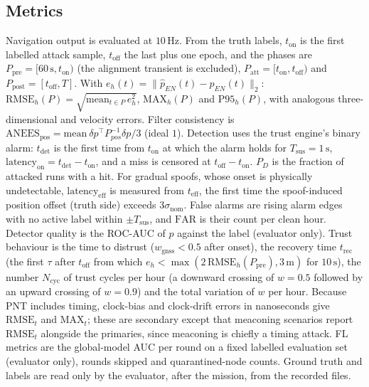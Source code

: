 \documentclass[journal]{IEEEtran}
\begin{document}
\subsection{Metrics}
\label{sec:metrics}
Navigation output is evaluated at $10\,\mathrm{Hz}$. From the truth labels, $t_{\mathrm{on}}$ is the first
labelled attack sample, $t_{\mathrm{off}}$ the last plus one epoch, and the phases are
$P_{\mathrm{pre}} = [60\,\mathrm{s}, t_{\mathrm{on}})$ (the alignment transient is excluded),
$P_{\mathrm{att}} = [t_{\mathrm{on}}, t_{\mathrm{off}})$ and $P_{\mathrm{post}} = [t_{\mathrm{off}}, T]$.
With $e_h(t) = \lVert \hat p_{EN}(t) - p_{EN}(t)\rVert_2$:
$\mathrm{RMSE}_h(P) = \sqrt{\mathrm{mean}_{t\in P}\,e_h^2}$, $\mathrm{MAX}_h(P)$ and $\mathrm{P95}_h(P)$, with
analogous three-dimensional and velocity errors. Filter consistency is
$\mathrm{ANEES}_{\mathrm{pos}} = \mathrm{mean}\ \delta p^{\top}P_{pos}^{-1}\delta p/3$ (ideal $1$).
Detection uses the trust engine's binary alarm: $t_{\mathrm{det}}$ is the first time from $t_{\mathrm{on}}$
at which the alarm holds for $T_{\mathrm{sus}} = 1\,\mathrm{s}$, $\mathrm{latency}_{\mathrm{on}} = t_{\mathrm{det}} - t_{\mathrm{on}}$,
and a miss is censored at $t_{\mathrm{off}} - t_{\mathrm{on}}$. $P_D$ is the fraction of attacked runs with a
hit. For gradual spoofs, whose onset is physically undetectable, $\mathrm{latency}_{\mathrm{eff}}$ is measured from
$t_{\mathrm{eff}}$, the first time the spoof-induced position offset (truth side) exceeds $3\sigma_{\mathrm{nom}}$.
False alarms are rising alarm edges with no active label within $\pm T_{\mathrm{sus}}$, and
$\mathrm{FAR}$ is their count per clean hour. Detector quality is the ROC-AUC of $p$ against the label
(evaluator only). Trust behaviour is the time to distrust ($w_{\mathrm{gnss}} < 0.5$ after onset), the
recovery time $t_{\mathrm{rec}}$ (the first $\tau$ after $t_{\mathrm{off}}$ from which $e_h < \max(2\,\mathrm{RMSE}_h(P_{\mathrm{pre}}),3\,\mathrm{m})$ for
$10\,\mathrm{s}$), the number $N_{\mathrm{cyc}}$ of trust cycles per hour (a downward crossing of $w=0.5$
followed by an upward crossing of $w=0.9$) and the total variation of $w$ per hour. Because PNT includes
timing, clock-bias and clock-drift errors in nanoseconds give $\mathrm{RMSE}_t$ and $\mathrm{MAX}_t$; these are
secondary except that meaconing scenarios report $\mathrm{RMSE}_t$ alongside the primaries, since meaconing
is chiefly a timing attack. FL metrics are the global-model AUC per round on a fixed labelled evaluation set
(evaluator only), rounds skipped and quarantined-node counts. Ground truth and labels are read only by the
evaluator, after the mission, from the recorded files.
\end{document}
